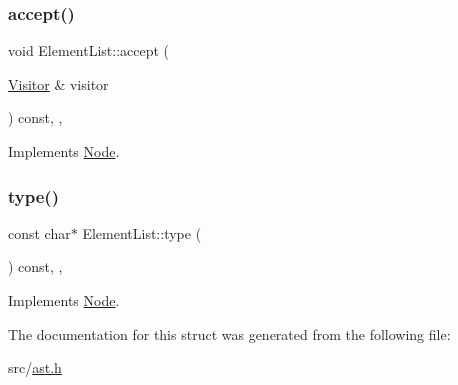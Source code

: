 \subsubsection{\texorpdfstring{accept()}{accept()}}
{\footnotesize\ttfamily void Element\+List\+::accept (\begin{DoxyParamCaption}\item[{\hyperlink{struct_visitor}{Visitor} \&}]{visitor }\end{DoxyParamCaption}) const\hspace{0.3cm}{\ttfamily [inline]}, {\ttfamily [override]}, {\ttfamily [virtual]}}



Implements \hyperlink{struct_node_a10bd7af968140bbf5fa461298a969c71}{Node}.

\mbox{\label{struct_element_list_ae1da6b963a837e315c28dd017afc06a7}} 
\subsubsection{\texorpdfstring{type()}{type()}}
{\footnotesize\ttfamily const char$\ast$ Element\+List\+::type (\begin{DoxyParamCaption}{ }\end{DoxyParamCaption}) const\hspace{0.3cm}{\ttfamily [inline]}, {\ttfamily [override]}, {\ttfamily [virtual]}}



Implements \hyperlink{struct_node_a82f29420d0a38efcc370352528e94e9b}{Node}.



The documentation for this struct was generated from the following file\+:\begin{DoxyCompactItemize}
\item 
src/\hyperlink{ast_8h}{ast.\+h}\end{DoxyCompactItemize}
